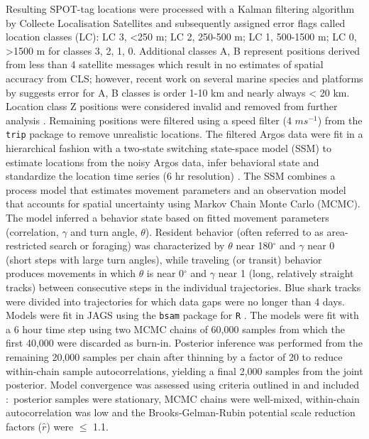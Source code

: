 Resulting SPOT-tag locations were processed with a Kalman filtering algorithm by Collecte Localisation Satellites \citep{Lopez2014} and subsequently assigned error flags called location classes (LC): LC 3, <250 m; LC 2, 250-500 m; LC 1, 500-1500 m; LC 0, >1500 m for classes 3, 2, 1, 0. Additional classes A, B represent positions derived from less than 4 satellite messages which result in no estimates of spatial accuracy from CLS; however, recent work on several marine species and platforms by \citet{Lopez2014} suggests error for A, B classes is order 1-10 km and nearly always < 20 km. Location class Z positions were considered invalid and removed from further analysis \citep{CLS2016}. Remaining positions were filtered using a speed filter (4 $m s^{-1}$) from the \texttt{trip} package \citep{Sumner2015} to remove unrealistic locations. The filtered Argos data were fit in a hierarchical fashion with a two-state switching state-space model (SSM) to estimate locations from the noisy Argos data, infer behavioral state and standardize the location time series (6 hr resolution) \citep{Jonsen2016}. The SSM combines a process model that estimates movement parameters and an observation model that accounts for spatial uncertainty using Markov Chain Monte Carlo (MCMC). The model inferred a behavior state based on fitted movement parameters (correlation, $\gamma$ and turn angle, $\theta$). Resident behavior (often referred to as area-restricted search or foraging) was characterized by $\theta$ near 180$^{\circ}$ and $\gamma$ near 0 (short steps with large turn angles), while traveling (or transit) behavior produces movements in which $\theta$ is near 0$^{\circ}$ and $\gamma$ near 1 (long, relatively straight tracks) between consecutive steps in the individual trajectories. Blue shark tracks were divided into trajectories for which data gaps were no longer than 4 days. Models were fit in JAGS \citep{Plummer2004} using the \texttt{bsam} package \citep{Jonsen2016} for \texttt{R} \citep{RDevelopmentCoreTeam2015}. The models were fit with a 6 hour time step using two MCMC chains of 60,000 samples from which the first 40,000 were discarded as burn-in. Posterior inference was performed from the remaining 20,000 samples per chain after thinning by a factor of 20 to reduce within-chain sample autocorrelations, yielding a final 2,000 samples from the joint posterior. Model convergence was assessed using criteria outlined in \citet{Jonsen2016} and included$\colon$ posterior samples were stationary, MCMC chains were well-mixed, within-chain autocorrelation was low and the Brooks-Gelman-Rubin potential scale reduction factors ($\hat{r}$) were $\leq$ 1.1.

